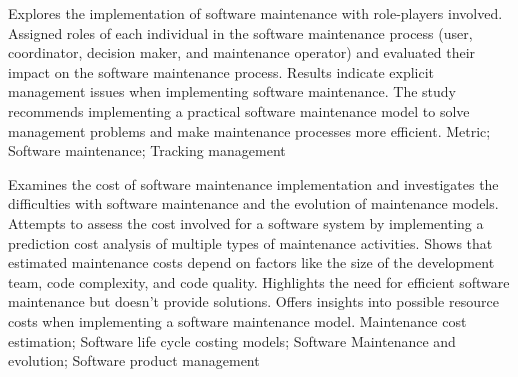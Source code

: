 
{
    Explores the implementation of software maintenance with role-players involved.
}
{
    Assigned roles of each individual in the software maintenance process (user, coordinator, decision maker, and maintenance operator) and evaluated their impact on the software maintenance process.
}
{
    Results indicate explicit management issues when implementing software maintenance.
}
{
    The study recommends implementing a practical software maintenance model to solve management problems and make maintenance processes more efficient.
}
{
    Metric; Software maintenance; Tracking management
}


{
    Examines the cost of software maintenance implementation and investigates the difficulties with software maintenance and the evolution of maintenance models.
}
{
    Attempts to assess the cost involved for a software system by implementing a prediction cost analysis of multiple types of maintenance activities.
}
{
    Shows that estimated maintenance costs depend on factors like the size of the development team, code complexity, and code quality.
}
{
    Highlights the need for efficient software maintenance but doesn't provide solutions. Offers insights into possible resource costs when implementing a software maintenance model.
}
{
    Maintenance cost estimation; Software life cycle costing models; Software Maintenance and evolution; Software product management
}

